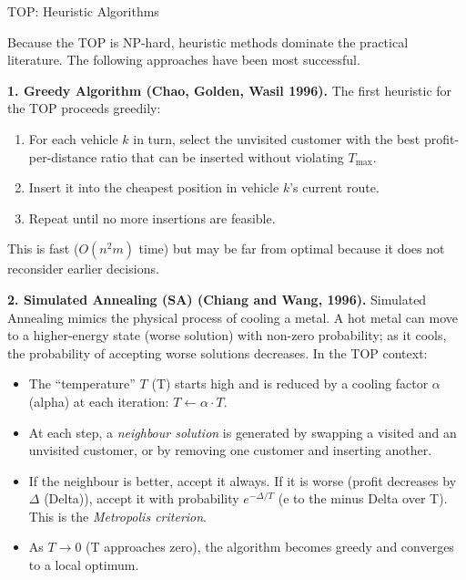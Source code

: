 \documentclass[aspectratio=169,10pt]{beamer}
\begin{document}
\begin{frame}[allowframebreaks]{TOP: Heuristic Algorithms}

  Because the TOP is NP-hard, heuristic methods dominate the practical
  literature.
  The following approaches have been most successful.

  \medskip
  \textbf{1. Greedy Algorithm (Chao, Golden, Wasil 1996).}
  The first heuristic for the TOP proceeds greedily:
  \begin{enumerate}
    \item For each vehicle $k$ in turn, select the unvisited customer with
          the best profit-per-distance ratio that can be inserted without
          violating $T_{\max}$.
    \item Insert it into the cheapest position in vehicle $k$'s current route.
    \item Repeat until no more insertions are feasible.
  \end{enumerate}
  This is fast ($O(n^2 m)$ time) but may be far from optimal because
  it does not reconsider earlier decisions.

  \medskip
  \textbf{2. Simulated Annealing (SA) (Chiang and Wang, 1996).}
  Simulated Annealing mimics the physical process of cooling a metal.
  A hot metal can move to a higher-energy state (worse solution) with
  non-zero probability; as it cools, the probability of accepting worse
  solutions decreases.
  In the TOP context:
  \begin{itemize}
    \item The ``temperature'' $T$ (T) starts high and is reduced by
          a cooling factor $\alpha$ (alpha) at each iteration:
          $T \leftarrow \alpha \cdot T$.
    \item At each step, a \emph{neighbour solution} is generated by
          swapping a visited and an unvisited customer, or by removing one
          customer and inserting another.
    \item If the neighbour is better, accept it always.
          If it is worse (profit decreases by $\Delta$ (Delta)), accept it
          with probability $e^{-\Delta / T}$ (e to the minus Delta over T).
          This is the \emph{Metropolis criterion}.
    \item As $T \to 0$ (T approaches zero), the algorithm becomes greedy
          and converges to a local optimum.
  \end{itemize}

  \framebreak


\end{frame}
\end{document}
